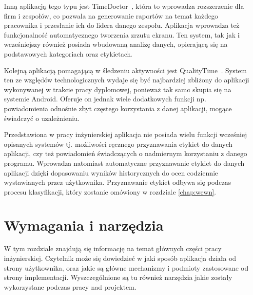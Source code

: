 \documentclass[a4paper,twoside,12pt]{book}
\begin{document}
Inną aplikacją tego typu jest TimeDoctor~\cite{time_doctor}, która to wprowadza rozszerzenie dla firm i zespołów, co pozwala na generowanie raportów na temat każdego pracownika i przesłanie ich do lidera danego zespołu. Aplikacja wprowadza też funkcjonalność automatycznego tworzenia zrzutu ekranu. Ten system, tak jak i wcześniejszy również posiada wbudowaną analizę danych, opierającą się na podstawowych kategoriach oraz etykietach.

Kolejną aplikacją pomagającą w śledzeniu aktywności jest QualityTime~\cite{quality_time}. System ten ze względów technologicznych wydaje się być najbardziej zbliżony do aplikacji wykonywanej w trakcie pracy dyplomowej, ponieważ tak samo skupia się na systemie Android. Oferuje on jednak wiele dodatkowych funkcji np. powiadomienia odnośnie zbyt częstego korzystania z danej aplikacji, mogące świadczyć o uzależnieniu.



Przedstawiona w pracy inżynierskiej aplikacja nie posiada wielu funkcji wcześniej opisanych systemów tj. możliwości ręcznego przyznawania etykiet do danych aplikacji, czy też powiadomień świadczących o nadmiernym korzystaniu z danego programu. Wprowadza natomiast automatyczne przyznawanie etykiet do danych aplikacji dzięki dopasowaniu wyników historycznych do ocen codziennie wystawianych przez użytkownika. Przyznawanie etykiet odbywa się podczas procesu klasyfikacji, który zostanie omówiony w rozdziale \ref{chap:wewn}. 





\chapter{Wymagania i narzędzia}
\label{chap:tools}
W tym rozdziale znajdują się informację na temat głównych części pracy inżynierskiej. Czytelnik może się dowiedzieć w jaki sposób aplikacja działa od strony użytkownika, oraz jakie są główne mechanizmy i podmioty zastosowane od strony implementacji. Wyszczególnione są tu również narzędzia jakie zostały wykorzystane podczas pracy nad projektem.
\end{document}
